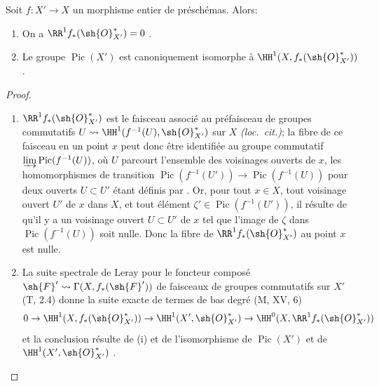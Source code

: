 \begin{corollary}[21.8.2]
\label{IV.21.8.2}
Soit $f:X'\to X$ un morphisme entier de préschémas.
Alors:
\begin{enumerate}[label=\textup{(\roman*)}]
  \item On a $\RR^1 f_*(\sh{O}^*_{X'})=0$ .
  \item Le groupe $\operatorname{Pic}(X')$ est canoniquement isomorphe à $\HH^1(X,f_*(\sh{O}^*_{X'}))$.
\end{enumerate}
\end{corollary}

\begin{proof}
\begin{enumerate}[label=(\roman*)]
  \item $\RR^1 f_*(\sh{O}^*_{X'})$ est le faisceau associé au préfaisceau de groupes commutatifs $U\leadsto\HH^1(f^{-1}(U),\sh{O}^*_{X'})$ sur $X$ \emph{(loc.\ cit.)};
la fibre de ce faisceau en un point $x$ peut donc  être identifiée au groupe commutatif $\varinjlim\operatorname{Pic}(f^{-1}(U))$, où $U$ parcourt l'ensemble des voisinages ouverts de $x$, les homomorphismes de transition $\operatorname{Pic}(f^{-1}(U'))\to\operatorname{Pic}(f^{-1}(U))$ pour deux ouverts $U\subset U'$ étant définis par .
Or, pour tout $x\in X$, tout voisinage ouvert $U'$ de $x$ dans $X$, et tout élément $\zeta'\in\operatorname{Pic}(f^{-1}(U'))$, il résulte de  qu'il y a un voisinage ouvert $U\subset U'$ de $x$ tel que l'image de $\zeta$ dans $\operatorname{Pic}(f^{-1}(U))$ soit nulle.
Donc la fibre de $\RR^1f_*(\sh{O}^*_{X'})$ au point $x$ est nulle.

  \item La suite spectrale de Leray pour le foncteur composé $\sh{F}'\leadsto\Gamma(X,f_*(\sh{F}'))$ de faisceaux de groupes commutatifs sur $X'$ (T, 2.4) donne la suite exacte de termes de bas degré (M, XV, 6)
\[
  0\to\HH^1(X,f_*(\sh{O}^*_{X'}))\to\HH^1(X',\sh{O}^*_{X'})\to\HH^0(X,\RR^1f_*(\sh{O}^*_{X'}))
\]
et la conclusion résulte de (i) et de l'isomorphisme de $\operatorname{Pic}(X')$ et de $\HH^1(X',\sh{O}^*_{X'})$ .
\end{enumerate}
\end{proof}

